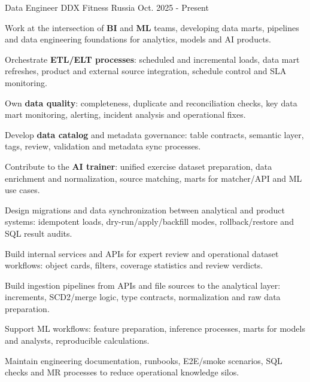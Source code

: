 

\begin{cventries}

  \cventry
    {Data Engineer} %
    {DDX Fitness} %
    {Russia} %
    {Oct. 2025 - Present} %
    {
      \begin{cvitems} %
        \item {Work at the intersection of \textbf{BI} and \textbf{ML} teams, developing data marts, pipelines and data engineering foundations for analytics, models and AI products.}
        \item {Orchestrate \textbf{ETL/ELT processes}: scheduled and incremental loads, data mart refreshes, product and external source integration, schedule control and SLA monitoring.}
        \item {Own \textbf{data quality}: completeness, duplicate and reconciliation checks, key data mart monitoring, alerting, incident analysis and operational fixes.}
        \item {Develop \textbf{data catalog} and metadata governance: table contracts, semantic layer, tags, review, validation and metadata sync processes.}
        \item {Contribute to the \textbf{AI trainer}: unified exercise dataset preparation, data enrichment and normalization, source matching, marts for matcher/API and ML use cases.}
        \item {Design migrations and data synchronization between analytical and product systems: idempotent loads, dry-run/apply/backfill modes, rollback/restore and SQL result audits.}
        \item {Build internal services and APIs for expert review and operational dataset workflows: object cards, filters, coverage statistics and review verdicts.}
        \item {Build ingestion pipelines from APIs and file sources to the analytical layer: increments, SCD2/merge logic, type contracts, normalization and raw data preparation.}
        \item {Support ML workflows: feature preparation, inference processes, marts for models and analysts, reproducible calculations.}
        \item {Maintain engineering documentation, runbooks, E2E/smoke scenarios, SQL checks and MR processes to reduce operational knowledge silos.}
      \end{cvitems}
    }


\end{cventries}
